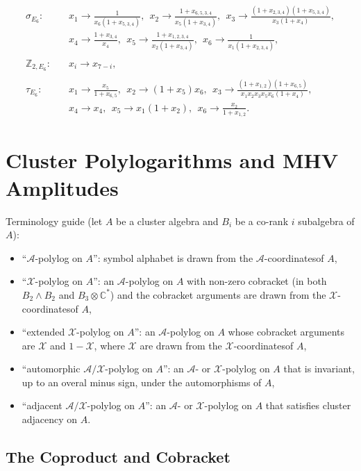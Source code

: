 \documentclass[11pt]{article}
\def\x{\mathcal{X}}
\def\xcoords{$\mathcal{X}$-coordinates}
\def\a{\mathcal{A}}
\def\acoords{$\mathcal{A}$-coordinates}
\def\bb2{B_2\wedge B_2}
\def\b3c{B_3 \otimes \mathbb{C}^*}
\begin{document}
\begin{equation}
\begin{split}
  \sigma_{E_6}:\quad& 
    x_1\to \frac{1}{x_6 (1+x_{5,3,4})},~~
    x_2\to \frac{1+x_{6,5,3,4}}{x_5 (1+x_{3,4})},~~
    x_3\to \frac{(1+x_{2,3,4}) (1+x_{5,3,4})}{x_3 (1+x_4)},\\&
    x_4\to \frac{1+x_{3,4}}{x_4},~~
    x_5\to \frac{1+x_{1,2,3,4}}{x_2 (1+x_{3,4})},~~
    x_6\to \frac{1}{x_1 (1+x_{2,3,4})},\\ \\
  \mathbb{Z}_{2,E_6}:\quad& 
    x_i\to x_{7-i},\\ \\
  \tau_{E_6}:\quad& 
    x_1\to \frac{x_5}{1+x_{6,5}},~~
    x_2\to (1+x_5) x_6,~~
    x_3\to \frac{(1+x_{1,2}) (1+x_{6,5})}{x_1 x_2 x_3 x_5 x_6 (1+x_4)},\\&
    x_4\to x_4,~~
    x_5\to x_1 (1+x_2),~~
    x_6\to \frac{x_2}{1+x_{1,2}}.
\end{split}  
\end{equation}


\section{Cluster Polylogarithms and MHV Amplitudes} \label{sec:cluster_polylog_MHV_review}

Terminology guide (let $A$ be a cluster algebra and $B_i$ be a co-rank $i$ subalgebra of $A$):
\begin{itemize}
	\item ``$\a$-polylog on $A$'': symbol alphabet is drawn from the \acoords of $A$,
	\item ``$\x$-polylog on $A$'': an $\a$-polylog on $A$ with non-zero cobracket (in both $\bb2$ and $\b3c$) and the cobracket arguments are drawn from the \xcoords of $A$,
	\item ``extended $\x$-polylog on $A$'': an $\a$-polylog on $A$ whose cobracket arguments are $\x$ and $1-\x$, where $\x$ are drawn from the \xcoords of $A$,
	\item ``automorphic $\a/\x$-polylog on $A$'': an $\a$- or $\x$-polylog on $A$ that is invariant, up to an overal minus sign, under the automorphisms of $A$,
	\item ``adjacent $\a/\x$-polylog on $A$'': an $\a$- or $\x$-polylog on $A$ that satisfies cluster adjacency on $A$.
\end{itemize}

\subsection{The Coproduct and Cobracket}
\end{document}
